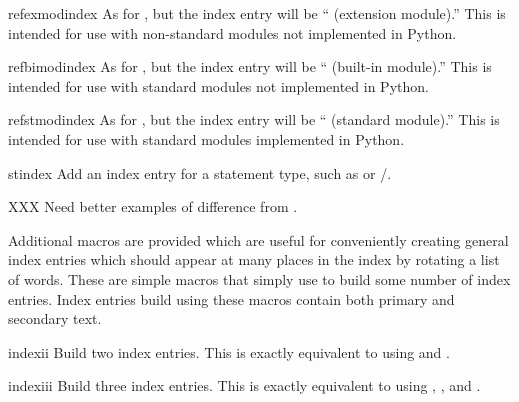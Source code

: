 \documentclass{howto}
\begin{document}
    \begin{macrodesc}{refexmodindex}{}
      As for , but the index entry will be
      `` (extension module).''  This is intended for use
      with non-standard modules not implemented in Python.
    \end{macrodesc}

    \begin{macrodesc}{refbimodindex}{}
      As for , but the index entry will be
      `` (built-in module).''  This is intended for use
      with standard modules not implemented in Python.
    \end{macrodesc}

    \begin{macrodesc}{refstmodindex}{}
      As for , but the index entry will be
      `` (standard module).''  This is intended for use
      with standard modules implemented in Python.
    \end{macrodesc}

    \begin{macrodesc}{stindex}{}
      Add an index entry for a statement type, such as 
      or /.

      XXX Need better examples of difference from .
    \end{macrodesc}


    Additional macros are provided which are useful for conveniently
    creating general index entries which should appear at many places
    in the index by rotating a list of words.  These are simple macros
    that simply use  to build some number of index
    entries.  Index entries build using these macros contain both
    primary and secondary text.

    \begin{macrodesc}{indexii}{}
      Build two index entries.  This is exactly equivalent to using
       and 
      .
    \end{macrodesc}

    \begin{macrodesc}{indexiii}{}
      Build three index entries.  This is exactly equivalent to using
      ,
      , and
      .
    \end{macrodesc}
\end{document}
